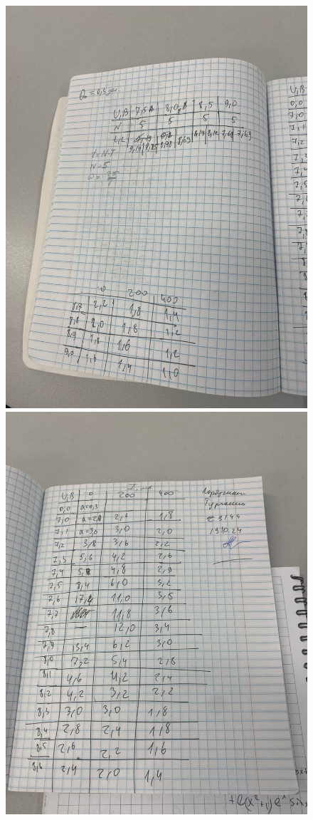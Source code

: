\documentclass[a4paper]{article}
\begin{document}
\begin{figure}[H]
\begin{center}
	\includegraphics[scale=0.15]{data_2.png}
	\includegraphics[scale=0.15]{data_3.png}

\end{center}
\end{figure}
\end{document}

